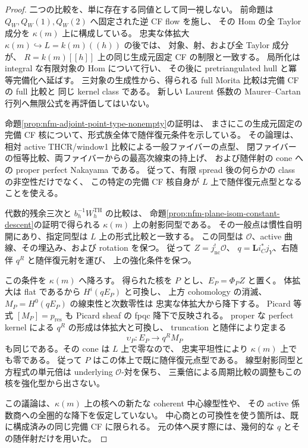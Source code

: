 \begin{proof}
二つの比較を、単に存在する同値として同一視しない。
前命題は $Q_W,Q_W(1),Q_W(2)$ へ固定された逆 CF flow を施し、
その Hom の全 Taylor 成分を $\kappa(m)$ 上に構成している。
忠実な体拡大 $\kappa(m)\hookrightarrow L=k(m)((h))$ の後では、
対象、射、および全 Taylor 成分が、
$R=k(m)[[h]]$ 上の同じ生成元固定 CF の制限と一致する。
局所化は integral な有限対象の Hom について行い、
その後に pretriangulated hull と冪等完備化へ延ばす。
三対象の生成性から、得られる full Morita 比較は完備 CF の full 比較と
同じ kernel class である。
新しい Laurent 係数の Maurer--Cartan 行列へ無限公式を再評価してはいない。

命題\ref{prop:nfm-adjoint-point-type-nonempty}の証明は、
まさにこの生成元固定の完備 CF 核について、形式族全体で随伴復元条件を示している。
その論理は、相対 active THCR/window1 比較による一般ファイバーの点型、
閉ファイバーの恒等比較、両ファイバーからの最高次線束の持上げ、
および随伴射の cone への proper perfect Nakayama である。
従って、有限 spread 後の何らかの class の非空性だけでなく、
この特定の完備 CF 核自身が $L$ 上で随伴復元点型となることを使える。

代数的残余三次と $b_h^{-1}W_h^{\mathrm{TH}}$ の比較は、
命題\ref{prop:nfm-plane-isom-constant-descent}の証明で得られる
$\kappa(m)$ 上の射影同型である。
その一般点は慣性自明開にあり、指定同型は $L$ 上の形式比較と一致する。
この同型は $\mathcal O$、active 曲線、その埋込み、および rotation を保つ。
従って $Z=j_{\mathrm{nc}}^!\mathcal O$、
$q=\mathbf Li_C^*j_Y$、右随伴 $q^R$ と随伴復元射を運び、
上の強化条件を保つ。

この条件を $\kappa(m)$ へ降ろす。
得られた核を $P$ とし、$E_P=\Phi_P Z$ と置く。
体拡大は flat であるから $H^i(qE_P)$ と可換し、
上方 cohomology の消滅、$M_P=H^0(qE_P)$ の線束性と次数零性は
忠実な体拡大から降下する。
Picard 等式 $[M_P]=p_{\mathrm{res}}$ も Picard sheaf の fpqc 降下で反映される。
proper な perfect kernel による $q^R$ の形成は体拡大と可換し、
truncation と随伴により定まる
\[
 \upsilon_P:E_P\longrightarrow q^R M_P
\]
も同じである。その cone は $L$ 上で零なので、
忠実平坦性により $\kappa(m)$ 上でも零である。
従って $P$ はこの体上で既に随伴復元点型である。
線型射影同型と方程式の単元倍は underlying $\mathcal O$-対を保ち、
三乗倍による周期比較の調整もこの核を強化型から出さない。

この議論は、$\kappa(m)$ 上の核への新たな coherent 中心線型性や、
その active 係数商への全圏的な降下を仮定していない。
中心商との可換性を使う箇所は、既に構成済みの同じ完備 CF に限られる。
元の体へ戻す際には、幾何的な $q$ とその随伴射だけを用いた。
\end{proof}

